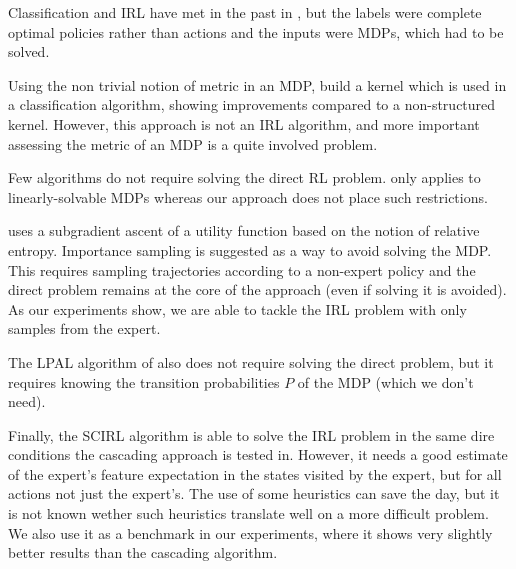 \documentclass[smallextended]{svjour3}
\begin{document}
Classification and IRL have met in the past in \cite{ratliff2006maximum}, but the labels were complete optimal policies rather than actions and the inputs were MDPs, which had to be solved.

Using the non trivial notion of metric in an MDP, \cite{melo2010learning} build a kernel which is used
in a classification algorithm, showing improvements compared to a
non-structured kernel. However, this approach is not an IRL
algorithm, and more important assessing the metric of an MDP is a
quite involved problem.


Few algorithms do not require solving the direct RL problem. \cite{Dvij:2010} only applies to linearly-solvable MDPs whereas our approach does not place such restrictions.

\cite{boularias:2011} uses a subgradient ascent of a utility function based on the notion of relative entropy. Importance sampling is suggested as a way to avoid solving the MDP. This requires sampling trajectories according to a non-expert policy and
the direct problem remains at the core of the approach (even if
solving it is avoided). As our experiments show, we are able to tackle the IRL problem with only samples from the expert.

The LPAL algorithm of \cite{syed2008apprenticeship} also does not require solving the direct problem, but it requires knowing the transition probabilities $P$ of the MDP (which we don't need).

Finally, the SCIRL algorithm \cite{klein2012scirl} is able to solve the IRL problem in the same dire conditions the cascading approach is tested in. However, it needs a good estimate of the expert's feature expectation in the states visited by the expert, but for all actions not just the expert's. The use of some heuristics can save the day, but it is not known wether such heuristics translate well on a more difficult problem. We also use it as a benchmark in our experiments, where it shows very slightly better results than the cascading algorithm.

\end{document}
